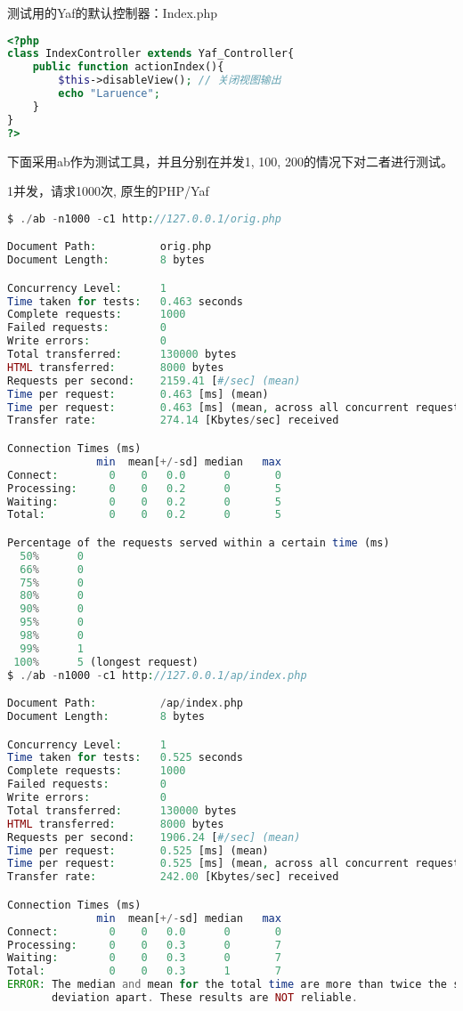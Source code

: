 测试用的Yaf的默认控制器：Index.php

\begin{lstlisting}[language=PHP]
<?php
class IndexController extends Yaf_Controller{
	public function actionIndex(){
		$this->disableView(); // 关闭视图输出
		echo "Laruence";
	}
}
?>
\end{lstlisting}

下面采用ab作为测试工具，并且分别在并发1, 100, 200的情况下对二者进行测试。

\begin{compactitem}
\item 1并发，请求1000次, 原生的PHP/Yaf

\begin{lstlisting}[language=PHP]
$ ./ab -n1000 -c1 http://127.0.0.1/orig.php

Document Path:          orig.php
Document Length:        8 bytes

Concurrency Level:      1
Time taken for tests:   0.463 seconds
Complete requests:      1000
Failed requests:        0
Write errors:           0
Total transferred:      130000 bytes
HTML transferred:       8000 bytes
Requests per second:    2159.41 [#/sec] (mean)
Time per request:       0.463 [ms] (mean)
Time per request:       0.463 [ms] (mean, across all concurrent requests)
Transfer rate:          274.14 [Kbytes/sec] received

Connection Times (ms)
              min  mean[+/-sd] median   max
Connect:        0    0   0.0      0       0
Processing:     0    0   0.2      0       5
Waiting:        0    0   0.2      0       5
Total:          0    0   0.2      0       5

Percentage of the requests served within a certain time (ms)
  50%      0
  66%      0
  75%      0
  80%      0
  90%      0
  95%      0
  98%      0
  99%      1
 100%      5 (longest request)
$ ./ab -n1000 -c1 http://127.0.0.1/ap/index.php

Document Path:          /ap/index.php
Document Length:        8 bytes

Concurrency Level:      1
Time taken for tests:   0.525 seconds
Complete requests:      1000
Failed requests:        0
Write errors:           0
Total transferred:      130000 bytes
HTML transferred:       8000 bytes
Requests per second:    1906.24 [#/sec] (mean)
Time per request:       0.525 [ms] (mean)
Time per request:       0.525 [ms] (mean, across all concurrent requests)
Transfer rate:          242.00 [Kbytes/sec] received

Connection Times (ms)
              min  mean[+/-sd] median   max
Connect:        0    0   0.0      0       0
Processing:     0    0   0.3      0       7
Waiting:        0    0   0.3      0       7
Total:          0    0   0.3      1       7
ERROR: The median and mean for the total time are more than twice the standard
       deviation apart. These results are NOT reliable.


\end{lstlisting}
\end{compactitem}
